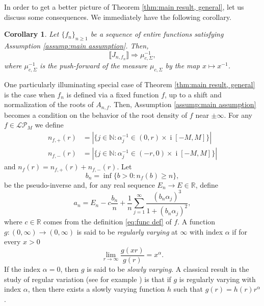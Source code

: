 \documentclass[reqno]{amsart}
\newcommand{\1}{\mathbf{1}}
\DeclareMathOperator{\ii}{i}
\newcommand{\R}{\mathbb{R}}
\newcommand{\N}{\mathbb{N}}
\def\R{\mathbb{R}}
\newcommand{\LP}{\mathcal{LP}}
\theoremstyle{plain}
\newtheorem{corollary}[theorem]{Corollary}
\theoremstyle{definition}
\theoremstyle{remark}
\numberwithin{equation}{section}
\begin{document}
In order to get a better picture of Theorem \ref{thm:main result, general}, let us discuss some consequences. We immediately have the following corollary. 
\begin{corollary}\label{cor:Convergnce of Jensen polynomials}
	Let $\{f_n\}_{n\geq 1}$ be a sequence of entire functions satisfying Assumption \ref{assump:main assumption}. Then, \begin{equation}
		\llbracket J_{n,f_n}\rrbracket\Rightarrow\mu_{c,\Sigma}^{-1},
	\end{equation} where $\mu_{c,\Sigma}^{-1}$ is the push-forward of the measure $\mu_{c,\Sigma}$ by the map $x\mapsto x^{-1}$.
\end{corollary}

One particularly illuminating special case of Theorem \ref{thm:main result, general} is the case when $f_n$ is defined via a fixed function $f$, up to a shift and normalization of the roots of $A_{n,f}$.
 Then, Assumption \ref{assump:main assumption} becomes a condition on the behavior of the root density of $f$ near $\pm\infty$.  For any $f\in\LP_{M}$  we define
\begin{align*}
n_{f,+}(r)&= |\{j\in\N:\alpha_{j}^{-1} \in (0,r)\times\ii[-M,M]\}|\\
n_{f,-}(r)&= |\{j\in\N:\alpha_{j}^{-1} \in (-r,0)\times\ii[-M,M]\}|
\end{align*} 
 and $n_{f}(r)=n_{f,+}(r)+n_{f,-}(r)$.  Let \begin{equation}\label{eq:b_n def}
 	b_n=\inf\{b>0:n_{f}(b)\geq n\},
 \end{equation} 
 be the pseudo-inverse and, for any  real sequence $E_n\to E\in\R$,  define 
 \begin{equation}\label{eq:a_n}
 	a_n=E_n-c\frac{b_n}{n}+\frac{1}{n}\sum_{j=1}^{\infty}\frac{(b_n\alpha_{j})^3}{1+(b_n\alpha_{j})^2},
 \end{equation} 
 where $c\in\R$ comes from the definition \eqref{eq:func def} of $f$.    %
 A function $g:(0,\infty)\rightarrow(0,\infty)$ is said to be \emph{regularly varying} at $\infty$ with  index $\alpha$ if for every $x>0$ \begin{equation}\label{eq:RV def}
	\lim\limits_{r\rightarrow\infty}\frac{g(xr)}{g(r)}=x^{\alpha}.
\end{equation} If the index $\alpha=0$, then $g$ is said to be \emph{slowly varying}. A classical result in the study of regular variation (see for example \cite{Resnick2007}) is that if $g$ is regularly varying with index $\alpha$, then there exists a slowly varying function $h$ such that $g(r)=h(r)r^{\alpha}$. 
\end{document}
